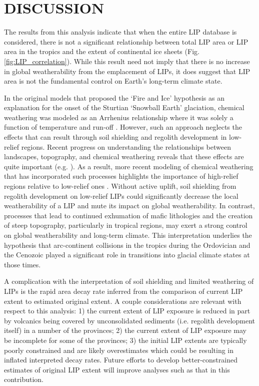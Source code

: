 \documentclass[11pt,letterpaper]{article}
\begin{document}
\section*{DISCUSSION}

The results from this analysis indicate that when the entire LIP database is considered, there is not a significant relationship between total LIP area or LIP area in the tropics and the extent of continental ice sheets (Fig. \ref{fig:LIP_correlation}). While this result need not imply that there is no increase in global weatherability from the emplacement of LIPs, it does suggest that LIP area is not the fundamental control on Earth's long-term climate state.

In the original models that proposed the `Fire and Ice' hypothesis as an explanation for the onset of the Sturtian `Snowball Earth' glaciation, chemical weathering was modeled as an Arrhenius relationship where it was solely a function of temperature and run-off \citep{Donnadieu2004a}. However, such an approach neglects the effects that can result through soil shielding and regolith development in low-relief regions. Recent progress on understanding the relationships between landscapes, topography, and chemical weathering reveals that these effects are quite important (e.g. \citealp{Maher2014a}). As a result, more recent modeling of chemical weathering that has incorporated such processes highlights the importance of high-relief regions relative to low-relief ones \citep{Godderis2017b}. Without active uplift, soil shielding from regolith development on low-relief LIPs could significantly decrease the local weatherability of a LIP and mute its impact on global weatherability. In contrast, processes that lead to continued exhumation of mafic lithologies and the creation of steep topography, particularly in tropical regions, may exert a strong control on global weatherability and long-term climate. This interpretation underlies the hypothesis that arc-continent collisions in the tropics during the Ordovician \citep{Swanson-Hysell2017a} and the Cenozoic \citep{Jagoutz2016a} played a significant role in transitions into glacial climate states at those times.

A complication with the interpretation of soil shielding and limited weathering of LIPs is the rapid area decay rate inferred from the comparison of current LIP extent to estimated original extent. A couple considerations are relevant with respect to this analysis: 1) the current extent of LIP exposure is reduced in part by volcanics being covered by unconsolidated sediments (i.e. regolith development itself) in a number of the provinces; 2) the current extent of LIP exposure may be incomplete for some of the provinces; 3) the initial LIP extents are typically poorly constrained and are likely overestimates which could be resulting in inflated interpreted decay rates. Future efforts to develop better-constrained estimates of original LIP extent will improve analyses such as that in this contribution.
\end{document}
